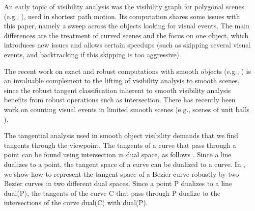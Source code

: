\documentclass[10pt,twocolumn]{article}
\begin{document}


An early topic of visibility analysis was the visibility graph for polygonal scenes
(e.g., \cite{welzl85}), used in shortest path motion.
Its computation shares some issues with this paper, namely a sweep across the objects
looking for visual events.
The main differences are the treatment of curved scenes and the focus
on one object, which introduces new issues and allows certain speedups (such as skipping
several visual events, and backtracking if this skipping is too aggressive).

The recent work on exact and robust computations with smooth objects 
(e.g., \cite{eigenwillig04,emiris04,lazard04}) is an invaluable complement to
the lifting of visibility analysis to smooth scenes,
since the robust tangent classification inherent to smooth visibility analysis
benefits from robust operations such as intersection.
%
There has recently been work on counting visual events in limited smooth scenes
(e.g., scenes of unit balls \cite{devillers02}).


The tangential analysis used in smooth object visibility
demands that we find tangents through the viewpoint.
The tangents of a curve that pass through a point can be found 
using intersection in dual space, as follows \cite{jj01b}.
Since a line dualizes to a point, the tangent space of a curve can be dualized to a curve.
In \cite{jj01a}, we show how to represent the tangent space of a Bezier curve robustly by
two Bezier curves in two different dual spaces.
Since a point P dualizes to a line dual(P), the tangents of the curve C that pass
through P dualize to the intersections of the curve dual(C) with dual(P).
\end{document}
